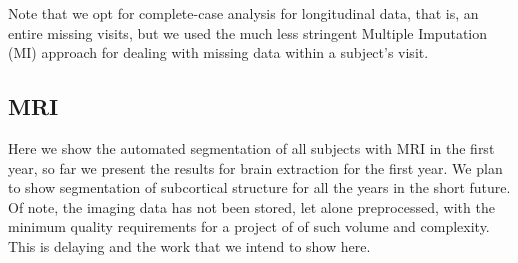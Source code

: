 \documentclass[11pt]{article}
\theoremstyle{definition}
\theoremstyle{remark}
\begin{document}
Note that we opt for complete-case analysis for longitudinal data, that is, an entire missing visits, but 
we used the much less stringent Multiple Imputation (MI) \cite{buuren2010mice} approach for dealing with missing data within a subject's visit.

\subsection{MRI}
\label{sse:mri}
Here we show the automated segmentation of all subjects with MRI in the first year, so far we present the results for brain extraction for the first year. We plan to show segmentation of subcortical structure for all the years in the short future. Of note, the imaging data has not been stored, let alone preprocessed, with the minimum quality requirements for a project of of such volume and complexity. This is delaying and the work that we intend to show here.
\end{document}
